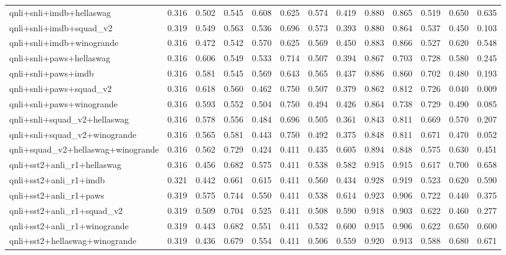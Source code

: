 \begin{table}[t]
\begin{tabular}{lrrrrrrrrrrrr}
    qnli+snli+imdb+hellaswag & 0.316 & 0.502 & 0.545 & 0.608 & 0.625 & 0.574 & 0.419 & 0.880 & 0.865 & 0.519 & 0.650 & 0.635 \\
    qnli+snli+imdb+squad\_v2 & 0.319 & 0.549 & 0.563 & 0.536 & 0.696 & 0.573 & 0.393 & 0.880 & 0.864 & 0.537 & 0.450 & 0.103 \\
    qnli+snli+imdb+winogrande & 0.316 & 0.472 & 0.542 & 0.570 & 0.625 & 0.569 & 0.450 & 0.883 & 0.866 & 0.527 & 0.620 & 0.548 \\
    qnli+snli+paws+hellaswag & 0.316 & 0.606 & 0.549 & 0.533 & 0.714 & 0.507 & 0.394 & 0.867 & 0.703 & 0.728 & 0.580 & 0.245 \\
    qnli+snli+paws+imdb & 0.316 & 0.581 & 0.545 & 0.569 & 0.643 & 0.565 & 0.437 & 0.886 & 0.860 & 0.702 & 0.480 & 0.193 \\
    qnli+snli+paws+squad\_v2 & 0.316 & 0.618 & 0.560 & 0.462 & 0.750 & 0.507 & 0.379 & 0.862 & 0.812 & 0.726 & 0.040 & 0.009 \\
    qnli+snli+paws+winogrande & 0.316 & 0.593 & 0.552 & 0.504 & 0.750 & 0.494 & 0.426 & 0.864 & 0.738 & 0.729 & 0.490 & 0.085 \\
    qnli+snli+squad\_v2+hellaswag & 0.316 & 0.578 & 0.556 & 0.484 & 0.696 & 0.505 & 0.361 & 0.843 & 0.811 & 0.669 & 0.570 & 0.207 \\
    qnli+snli+squad\_v2+winogrande & 0.316 & 0.565 & 0.581 & 0.443 & 0.750 & 0.492 & 0.375 & 0.848 & 0.811 & 0.671 & 0.470 & 0.052 \\
    qnli+squad\_v2+hellaswag+winogrande & 0.316 & 0.562 & 0.729 & 0.424 & 0.411 & 0.435 & 0.605 & 0.894 & 0.848 & 0.575 & 0.630 & 0.451 \\
    qnli+sst2+anli\_r1+hellaswag & 0.316 & 0.456 & 0.682 & 0.575 & 0.411 & 0.538 & 0.582 & 0.915 & 0.915 & 0.617 & 0.700 & 0.658 \\
    qnli+sst2+anli\_r1+imdb & 0.321 & 0.442 & 0.661 & 0.615 & 0.411 & 0.560 & 0.434 & 0.928 & 0.919 & 0.523 & 0.620 & 0.590 \\
    qnli+sst2+anli\_r1+paws & 0.319 & 0.575 & 0.744 & 0.550 & 0.411 & 0.538 & 0.614 & 0.923 & 0.906 & 0.722 & 0.440 & 0.375 \\
    qnli+sst2+anli\_r1+squad\_v2 & 0.319 & 0.509 & 0.704 & 0.525 & 0.411 & 0.508 & 0.590 & 0.918 & 0.903 & 0.622 & 0.460 & 0.277 \\
    qnli+sst2+anli\_r1+winogrande & 0.319 & 0.443 & 0.682 & 0.551 & 0.411 & 0.532 & 0.600 & 0.915 & 0.906 & 0.622 & 0.650 & 0.600 \\
    qnli+sst2+hellaswag+winogrande & 0.319 & 0.436 & 0.679 & 0.554 & 0.411 & 0.506 & 0.559 & 0.920 & 0.913 & 0.588 & 0.680 & 0.671 \\

\end{tabular}
\end{table}
